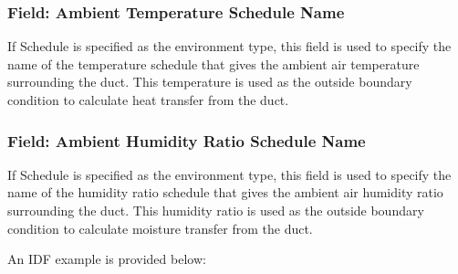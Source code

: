 \subsubsection{Field: Ambient Temperature Schedule Name}\label{ductloss-ambienttemperatureschedulename}

If Schedule is specified as the environment type, this field is used to specify the name of the temperature schedule that gives the ambient air temperature surrounding the duct. This temperature is used as the outside boundary condition to calculate heat transfer from the duct.

\subsubsection{Field: Ambient Humidity Ratio Schedule Name}\label{ambienttemperatureschedulename}

If Schedule is specified as the environment type, this field is used to specify the name of the humidity ratio schedule that gives the ambient air humidity ratio surrounding the duct. This humidity ratio is used as the outside boundary condition to calculate moisture transfer from the duct.

An IDF example is provided below:

